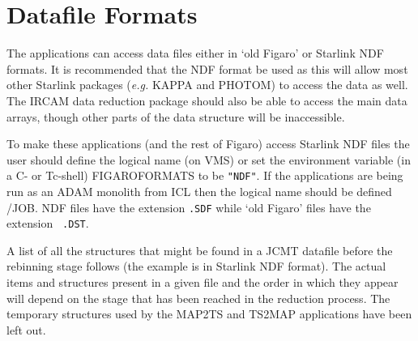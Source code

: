 \documentclass[twoside,11pt]{article}
\newcommand{\xlabel}[1]{}
\renewcommand{\_}{\texttt{\symbol{95}}}
\begin{document}
\goodbreak

\section{Datafile Formats
\xlabel{datafile_formats}\label{sec-data}}

The applications can access data files either in `old Figaro' or
Starlink  NDF formats. It is recommended that the NDF format be used
as this will allow most other Starlink packages ({\em e.g.} KAPPA and
PHOTOM) to access the data as well. The IRCAM data reduction package
should also be able to access the main data arrays, though other parts
of the data structure will be inaccessible.

To make these applications (and the rest of Figaro) access Starlink
NDF files the user should define the logical name (on VMS) or set the
environment variable (in a C- or Tc-shell) FIGARO\_FORMATS to
be {\tt  "NDF"}. If the applications are being run as an ADAM monolith from
ICL then the logical name should be defined /JOB. NDF files have the
extension {\tt .SDF} while `old Figaro' files have the extension {\tt
.DST}.

A list of all the structures that might be found in a JCMT datafile
before the rebinning stage follows (the example is in Starlink NDF
format).  The actual items and  structures present in a given file and
the order in which they appear will depend on the stage that has been
reached in the reduction process. The temporary structures used by the
MAP2TS and TS2MAP applications  have been left out.

\goodbreak
\end{document}
